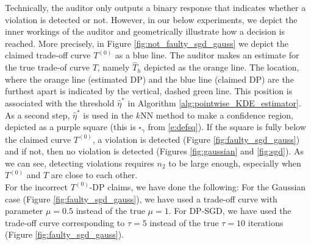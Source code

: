 Technically, the auditor only outputs a binary response that indicates whether a violation is detected or not. However, in our below experiments, we depict the inner workings of the auditor and geometrically illustrate how a decision is reached. More precisely, in Figure \ref{fig:not_faulty_sgd_gauss} we depict the claimed trade-off curve $T^{(0)}$ as a blue line. The auditor makes an estimate for the true trade-of curve $T$, namely $\hat T_h$ depicted as the orange line. The location, where the orange line (estimated DP) and the blue line (claimed DP) are the furthest apart is indicated by the vertical, dashed green line. This position is associated with the threshold $\hat \eta^*$ in Algorithm \ref{alg:pointwise_KDE_estimator}. As a second step, $\hat \eta^*$ is used in the $k$NN method to make a confidence region, depicted as a purple square (this is $\square_\gamma$ from \eqref{e:defsq}). If the square is fully below the claimed curve $T^{(0)}$, a violation is detected (Figure \ref{fig:faulty_sgd_gauss}) and if not, then no violation is detected (Figures \ref{fig:gaussian} and \ref{fig:sgd}). As we can see, detecting violations requires $n_2$ to be large enough, especially when $T^{(0)}$ and $T$ are close to each other. \\
For the incorrect $T^{(0)}$-DP claims, we have done the following: For the Gaussian case (Figure \ref{fig:faulty_sgd_gauss}), we have used a trade-off curve with parameter $\mu=0.5$ instead of the true $\mu=1$. For DP-SGD, we have used the trade-off curve corresponding to $\tau = 5$ instead of the true $\tau =10$ iterations (Figure \ref{fig:faulty_sgd_gauss}). 

